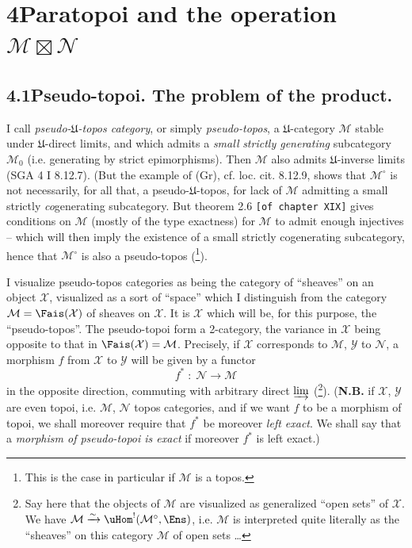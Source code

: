 

\section*{4\quad Paratopoi and the operation $\mathcal{M}\boxtimes\mathcal{N}$}

\subsection*{4.1\quad Pseudo-topoi. The problem of the product.}

I call \textit{pseudo-$\mathfrak{U}$-topos category}, or simply \textit{pseudo-topos}, a $\mathfrak{U}$-category $\mathcal{M}$ stable under $\mathfrak{U}$-direct limits, and which admits a \textit{small} \textit{strictly generating} subcategory $\mathcal{M}_0$ (i.e. generating by strict epimorphisms). Then $\mathcal{M}$ also admits $\mathfrak{U}$-inverse limits (SGA 4 I 8.12.7). (But the example of (Gr), cf. loc. cit. 8.12.9, shows that $\mathcal{M}^\circ$ is not necessarily, for all that, a pseudo-$\mathfrak{U}$-topos, for lack of $\mathcal{M}$ admitting a small strictly \textit{co}generating subcategory. But theorem 2.6 \texttt{[of chapter XIX]} gives conditions on $\mathcal{M}$ (mostly of the type exactness) %
for $\mathcal{M}$ to admit enough injectives -- which will then imply the existence of a small strictly cogenerating subcategory, hence that $\mathcal{M}^\circ$ is also a pseudo-topos (\footnote{This is the case in particular if $\mathcal{M}$ is a topos.}).

I visualize pseudo-topos categories as being the category of ``sheaves'' on an object $\mathcal{X}$, visualized as a sort of ``space'' which I distinguish from the category $\mathcal{M}=\Fais(\mathcal{X})$ of sheaves on $\mathcal{X}$. It is $\mathcal{X}$ which will be, for this purpose, the ``pseudo-topos''. The pseudo-topoi form a 2-category, the variance in $\mathcal{X}$ being opposite to that in $\Fais(\mathcal{X})=\mathcal{M}$. Precisely, if $\mathcal{X}$ corresponds to $\mathcal{M}$, $\mathcal{Y}$ to $\mathcal{N}$, a morphism $f$ from $\mathcal{X}$ to $\mathcal{Y}$ will be given by a functor
\[
f^* \;:\; \mathcal{N} \longrightarrow \mathcal{M}
\tag*{(4.1.1)}
\]
in the opposite direction, commuting with arbitrary direct $\varinjlim$ (\footnote{Say here that the objects of $\mathcal{M}$ are visualized as generalized ``open sets'' of $\mathcal{X}$. We have $\mathcal{M}\xrightarrow{\sim}\uHom^!(\mathcal{M}^\circ,\Ens)$, i.e. $\mathcal{M}$ is interpreted quite literally as the ``sheaves'' on this category $\mathcal{M}$ of open sets \ldots}). (\textbf{N.B.} if $\mathcal{X}$, $\mathcal{Y}$ are even topoi, i.e. $\mathcal{M}$, $\mathcal{N}$ topos categories, and if we want $f$ to be a morphism of topoi, we shall moreover require that $f^*$ be moreover \textit{left exact}. We shall say that a \textit{morphism of pseudo-topoi is exact} if moreover $f^*$ is left exact.)

